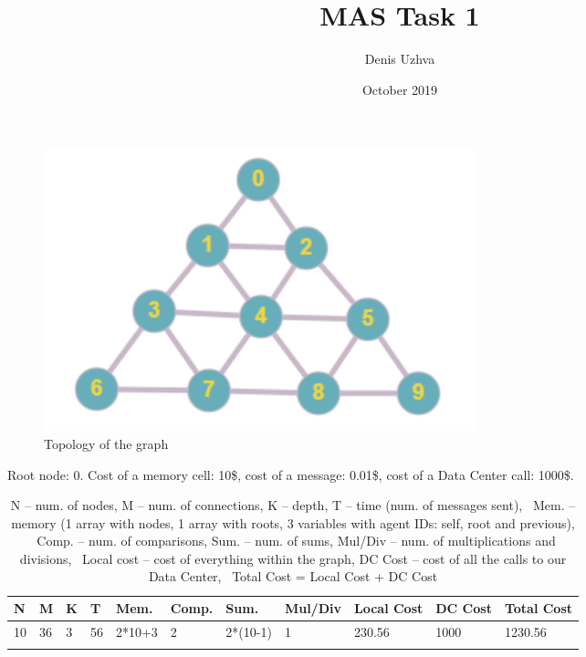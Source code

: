 \documentclass{article}
\begin{document}
\title{MAS Task 1}
\author{Denis Uzhva}
\date{October 2019}
\maketitle

\begin{figure}[H]
    \centering
    \includegraphics[width=.6\textwidth]{triangleTen.png}
    \caption{Topology of the graph}
    \label{fig:gr}
\end{figure}

Root node: 0. Cost of a memory cell: 10\$, cost of a message: 0.01\$, cost of a Data Center call: 1000\$.

\begin{scriptsize}
\begin{longtable}{lllllllllll}
	\toprule
	N	&	M	&	K	&	T	&	Mem.	&	Comp.	&	Sum.		&	Mul/Div	&	Local Cost	&	DC Cost	&	Total Cost	\\
	\midrule
	10	&	36	&	3	&	56	&	2*10+3	&	2		&	2*(10-1)	&	1		&	230.56		&	1000	&	1230.56		\\
    \bottomrule
	\caption{N -- num. of nodes, M -- num. of connections, K -- depth, T -- time (num. of messages sent), \
		Mem. -- memory (1 array with nodes, 1 array with roots, 3 variables with agent IDs: self, root and previous), \
		Comp. -- num. of comparisons, Sum. -- num. of sums, Mul/Div -- num. of multiplications and divisions, \
		Local cost -- cost of everything within the graph, DC Cost -- cost of all the calls to our Data Center, \
		Total Cost = Local Cost + DC Cost}
	\label{tab:acc}
\end{longtable}
\end{scriptsize}
\end{document}
